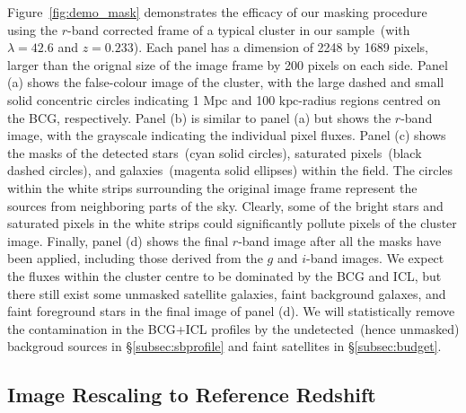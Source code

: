 \documentclass[fleqn,usenatbib]{mnras}
\newcommand{\mpc}{\mathrm{Mpc}}
\newcommand{\kpc}{\mathrm{kpc}}
\begin{document}
Figure~\ref{fig:demo_mask} demonstrates the efficacy of our masking
procedure using the $r$-band corrected frame of a typical cluster in our
sample~(with $\lambda{=}42.6$ and $z{=}0.233$). Each panel has a dimension
of 2248 by 1689 pixels, larger than the orignal size of the image frame by
200 pixels on each side. Panel (a) shows the false-colour image of the
cluster, with the large dashed and small solid concentric circles
indicating 1 $\mpc$ and 100 $\kpc$-radius regions centred on the BCG,
respectively.  Panel (b) is similar to panel (a) but shows the $r$-band
image, with the grayscale indicating the individual pixel fluxes.  Panel
(c) shows the masks of the detected stars~(cyan solid circles), saturated
pixels~(black dashed circles), and galaxies~(magenta solid ellipses) within
the field. The circles within the white strips surrounding the original
image frame represent the sources from neighboring parts of the sky.
Clearly, some of the bright stars and saturated pixels in the white strips
could significantly pollute pixels of the cluster image. Finally, panel (d)
shows the final $r$-band image after all the masks have been applied,
including those derived from the $g$ and $i$-band images. We expect the
fluxes within the cluster centre to be dominated by the BCG and ICL, but
there still exist some unmasked satellite galaxies, faint background
galaxes, and faint foreground stars in the final image of panel (d). We
will statistically remove the contamination in the BCG+ICL profiles by the
undetected~(hence unmasked) backgroud sources in \S\ref{subsec:sbprofile}
and faint satellites in \S\ref{subsec:budget}.


\subsection{Image Rescaling to Reference Redshift}
\label{subsec:rescale}
\end{document}
